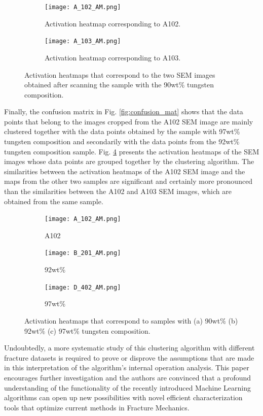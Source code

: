 \documentclass[authoryear,preprint,review,12pt, singleside]{elsarticle}
\begin{document}
\begin{figure}[!h]
	\centering
	\begin{subfigure}[b]{0.49\textwidth}
		\centering
		\texttt{[image: A\_102\_AM.png]}
		\caption{Activation heatmap corresponding to A102.}
		\label{fig:A_102_am}
	\end{subfigure}
	\begin{subfigure}[b]{0.49\textwidth}
		\centering
		\texttt{[image: A\_103\_AM.png]}
		\caption{Activation heatmap corresponding to A103.}
		\label{fig:A_103_am}
	\end{subfigure}
	\caption{Activation heatmaps that correspond to the two SEM images obtained after scanning the sample with the 90wt\% tungsten composition.}
	\label{fig:A_activ}
\end{figure}


Finally, the confusion matrix in Fig. \ref{fig:confusion_mat} shows that the data points that belong to the images cropped from the A102 SEM image are mainly clustered together with the data points obtained by the sample with 97wt\% tungsten composition and secondarily with the data points from the 92wt\% tungsten composition sample. Fig. \ref{fig:ABD_activ} presents the activation heatmaps of the SEM images whose data points are grouped together by the clustering algorithm. The similarities between the activation heatmaps of the A102 SEM image and the maps from the other two samples are significant and certainly more pronounced than the similarities between the A102 and A103 SEM images, which are obtained from the same sample.   


\begin{figure}[!h]
	\centering
	\begin{subfigure}[b]{0.45\textwidth}
		\centering
		\texttt{[image: A\_102\_AM.png]}
		\caption{A102}
	\end{subfigure}
	\begin{subfigure}[b]{0.45\textwidth}
		\centering
		\texttt{[image: B\_201\_AM.png]}
		\caption{92wt\%}
	\end{subfigure}
	\begin{subfigure}[b]{0.45\textwidth}
		\centering
		\texttt{[image: D\_402\_AM.png]}
		\caption{97wt\% }
	\end{subfigure}
	\caption{Activation heatmaps that correspond to samples with (a) 90wt\% (b) 92wt\% (c) 97wt\% tungsten composition.}
	\label{fig:ABD_activ}
\end{figure}


Undoubtedly, a more systematic study of this clustering algorithm with different fracture datasets is required to prove or disprove the assumptions that are made in this interpretation of the algorithm's internal operation analysis. This paper encourages further investigation and the authors are convinced that a profound understanding of the functionality of the recently introduced Machine Learning algorithms can open up new possibilities with novel efficient characterization tools that optimize current methods in Fracture Mechanics.          
  
\end{document}
